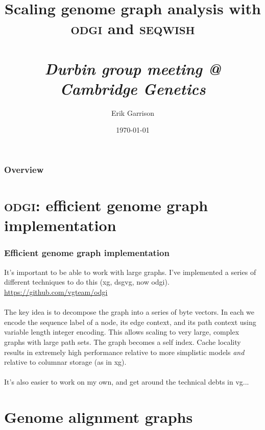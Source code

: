 \documentclass[aspectratio=169]{beamer}
\title[rdgroup meeting 20190315]{Scaling genome graph analysis with \textsc{odgi} and \textsc{seqwish} \\~\\ \emph{\small Durbin group meeting @ Cambridge Genetics}} %
\author{Erik Garrison} %
\institute[UCSC] %
{
University of California, Santa Cruz \\ %
\medskip
\textit{erik.garrison@gmail.com} %
}
\date{\today} %
\begin{document}
\begin{frame}
\titlepage %
\end{frame}

\begin{frame}
\frametitle{Overview} %
\tableofcontents %
\end{frame}


\section{\textsc{odgi}: efficient genome graph implementation}
\begin{frame}
  \frametitle{Efficient genome graph implementation}
  It's important to be able to work with large graphs.
  I've implemented a series of different techniques to do this (xg, dsgvg, now odgi).
  \url{https://github.com/vgteam/odgi}
  \\~\\
  The key idea is to decompose the graph into a series of byte vectors.
  In each we encode the sequence label of a node, its edge context, and its path context using variable length integer encoding.
  This allows scaling to very large, complex graphs with large path sets.
  The graph becomes a self index.
  Cache locality results in extremely high performance relative to more simplistic models \emph{and} relative to columnar storage (as in xg).
  \\~\\
  It's also easier to work on my own, and get around the technical debts in vg...
\end{frame}

\section{Genome alignment graphs} %
\end{document}
